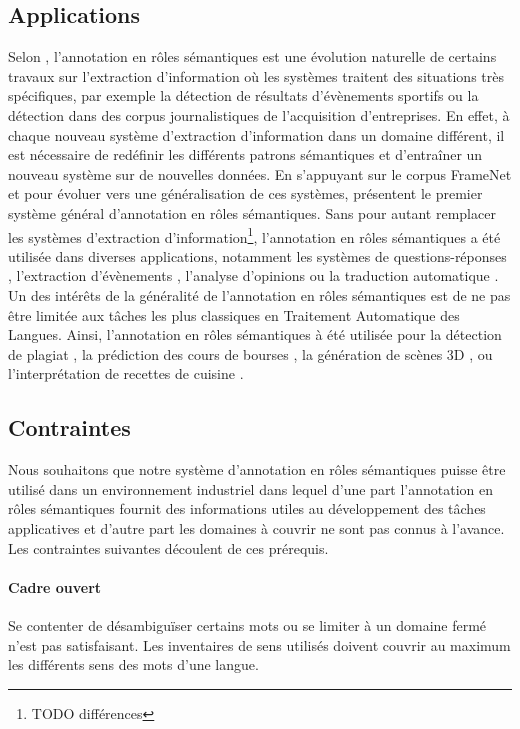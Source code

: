 \subsection{Applications}

Selon \cite{gildea2002automatic}, l'annotation en rôles sémantiques est une
évolution naturelle de certains travaux sur l'extraction d'information où les
systèmes traitent des situations très spécifiques, par exemple la détection de
résultats d'évènements sportifs ou la détection dans des corpus journalistiques
de l'acquisition d'entreprises. En effet, à chaque nouveau système d'extraction
d'information dans un domaine différent, il est nécessaire de redéfinir les
différents patrons sémantiques et d'entraîner un nouveau système sur de
nouvelles données. En s'appuyant sur le corpus FrameNet et pour évoluer vers
une généralisation de ces systèmes, \cite{gildea2002automatic} présentent le
premier système général d'annotation en rôles sémantiques. Sans pour autant
remplacer les systèmes d'extraction d'information\footnote{TODO différences},
l'annotation en rôles sémantiques a été utilisée dans diverses applications,
notamment les systèmes de questions-réponses \citep{shen2007using},
l'extraction d'évènements \citep{exner2011using},  l'analyse d'opinions
\citep{das2012structure} ou la traduction automatique
\citep{bazrafshan2013semantic}. Un des intérêts de la généralité de
l'annotation en rôles sémantiques est de ne pas être limitée aux tâches les
plus classiques en Traitement Automatique des Langues. Ainsi, l'annotation en
rôles sémantiques à été utilisée pour la détection de plagiat
\citep{osman2012improved}, la prédiction des cours de bourses
\citep{xie2013semantic}, la génération de scènes 3D \citep{chang2014semantic},
ou l'interprétation de recettes de cuisine \citep{malmaud2014cooking}.

\subsection{Contraintes}

Nous souhaitons que notre système d'annotation en rôles sémantiques puisse être
utilisé dans un environnement industriel dans lequel d'une part l'annotation en
rôles sémantiques fournit des informations utiles au développement des tâches
applicatives et d'autre part les domaines à couvrir ne sont pas connus à
l'avance. Les contraintes suivantes découlent de ces prérequis.

\paragraph{Cadre ouvert} Se contenter de désambiguïser certains mots ou se
limiter à un domaine fermé n'est pas satisfaisant. Les inventaires de sens
utilisés doivent couvrir au maximum les différents sens des mots d'une langue.

